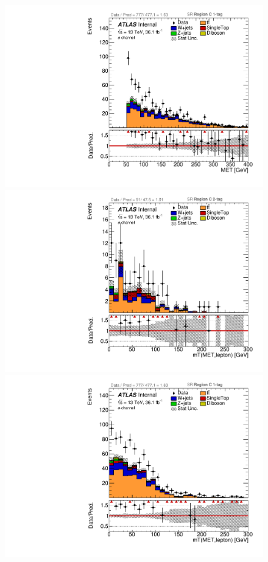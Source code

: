 \begin{figure}[!htbp]
\begin{center}
\includegraphics[scale=0.23]{./figures/boosted/ABCD/elec_SR_RegionC_1tag_MET}\\
\includegraphics[scale=0.23]{./figures/boosted/ABCD/elec_SR_RegionC_WlepMtATLAS}
\includegraphics[scale=0.23]{./figures/boosted/ABCD/elec_SR_RegionC_1tag_WlepMtATLAS}\\

\end{center}
\end{figure}
